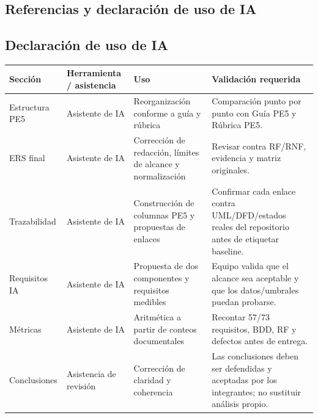 \documentclass[11pt,a4paper]{article}
\begin{document}
\begin{appendices}
	\section{Referencias y declaración de uso de IA}
	\subsection{Declaración de uso de IA}
	\begin{longtable}{p{3cm}p{3.2cm}p{3.8cm}p{4.5cm}}\toprule\textbf{Sección}&\textbf{Herramienta / asistencia}&\textbf{Uso}&\textbf{Validación requerida}\\\midrule\endhead
		Estructura PE5&Asistente de IA&Reorganización conforme a guía y rúbrica&Comparación punto por punto con Guía PE5 y Rúbrica PE5.\\
		ERS final&Asistente de IA&Corrección de redacción, límites de alcance y normalización&Revisar contra RF/RNF, evidencia y matriz originales.\\
		Trazabilidad&Asistente de IA&Construcción de columnas PE5 y propuestas de enlaces&Confirmar cada enlace contra UML/DFD/estados reales del repositorio antes de etiquetar baseline.\\
		Requisitos IA&Asistente de IA&Propuesta de dos componentes y requisitos medibles&Equipo valida que el alcance sea aceptable y que los datos/umbrales puedan probarse.\\
		Métricas&Asistente de IA&Aritmética a partir de conteos documentales&Recontar 57/73 requisitos, BDD, RF y defectos antes de entrega.\\
		Conclusiones&Asistencia de revisión&Corrección de claridad y coherencia&Las conclusiones deben ser defendidas y aceptadas por los integrantes; no sustituir análisis propio.\\\bottomrule\end{longtable}
	

\end{appendices}
\end{document}
